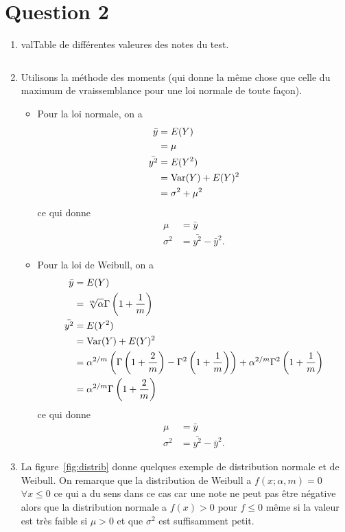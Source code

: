 \section{Question 2}
\begin{enumerate}
  \item
    \begin{mytable}{val}{Table de différentes valeures des notes du test.}
      \begin{tabular}{ll}
        
      \end{tabular}
    \end{mytable}
  \item Utilisons la méthode des moments
    (qui donne la même chose que celle du maximum de vraissemblance pour
    une loi normale de toute façon).
    \begin{itemize}
      \item
        Pour la loi normale, on a
        \begin{align*}
          \bar{y} & = E(Y)\\
                  & = \mu\\
          \bar{y^2} & = E(Y^2)\\
                    & = \operatorname{Var}(Y) + E(Y)^2\\
                    & = \sigma^2 + \mu^2
        \end{align*}
        ce qui donne
        \begin{align*}
          \mu & = \bar{y}\\
          \sigma^2 & = \bar{y^2} - \bar{y}^2.
        \end{align*}
      \item
        Pour la loi de Weibull, on a
        \begin{align*}
          \bar{y} & = E(Y)\\
                  & = \sqrt[m]{\alpha}\Gamma\left(1 + \frac{1}{m}\right)\\
          \bar{y^2} & = E(Y^2)\\
                    & = \operatorname{Var}(Y) + E(Y)^2\\
                    & = \alpha^{2/m}\left(\Gamma\left(1 + \frac{2}{m}\right) -
                    \Gamma^2\left(1 + \frac{1}{m}\right)\right) + \alpha^{2/m}\Gamma^2\left(1 + \frac{1}{m}\right)\\
                    & = \alpha^{2/m}\Gamma\left(1 + \frac{2}{m}\right)
        \end{align*}
        ce qui donne
        \begin{align*}
          \mu & = \bar{y}\\
          \sigma^2 & = \bar{y^2} - \bar{y}^2.
        \end{align*}
    \end{itemize}
  \item
    La figure~\ref{fig:distrib} donne quelques exemple de distribution normale et de Weibull.
    On remarque que la distribution de Weibull a $f(x; \alpha, m) = 0$ $\forall x \leq 0$
    ce qui a du sens dans ce cas car une note ne peut pas être négative alors que
    la distribution normale a $f(x) > 0$ pour $f \leq 0$ même si la valeur est très faible
    si $\mu > 0$ et que $\sigma^2$ est suffisamment petit.


\end{enumerate}
